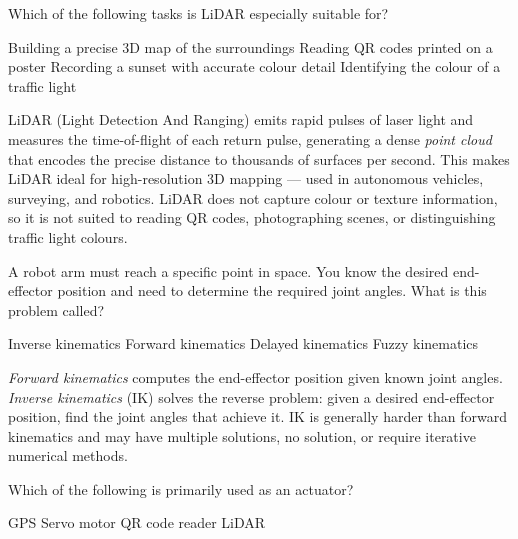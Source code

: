 \documentclass[answers]{exam}
\begin{document}
\begin{questions}
\question Which of the following tasks is LiDAR especially suitable for?

\begin{choices}
    \correctchoice Building a precise 3D map of the surroundings
    \choice Reading QR codes printed on a poster
    \choice Recording a sunset with accurate colour detail
    \choice Identifying the colour of a traffic light
\end{choices}

\begin{solution}
    LiDAR (Light Detection And Ranging) emits rapid pulses of laser light and measures the time-of-flight of each return pulse, generating a dense \textit{point cloud} that encodes the precise distance to thousands of surfaces per second.
    This makes LiDAR ideal for high-resolution 3D mapping --- used in autonomous vehicles, surveying, and robotics.
    LiDAR does not capture colour or texture information, so it is not suited to reading QR codes, photographing scenes, or distinguishing traffic light colours.
\end{solution}

\question A robot arm must reach a specific point in space. You know the desired end-effector position and need to determine the required joint angles. What is this problem called?

\begin{oneparchoices}
    \correctchoice Inverse kinematics
    \choice Forward kinematics
    \choice Delayed kinematics
    \choice Fuzzy kinematics
\end{oneparchoices}

\begin{solution}
    \textit{Forward kinematics} computes the end-effector position given known joint angles.
    \textit{Inverse kinematics} (IK) solves the reverse problem: given a desired end-effector position, find the joint angles that achieve it.
    IK is generally harder than forward kinematics and may have multiple solutions, no solution, or require iterative numerical methods.
\end{solution}

\question Which of the following is primarily used as an actuator?

\begin{oneparchoices}
    \choice GPS
    \correctchoice Servo motor
    \choice QR code reader
    \choice LiDAR
\end{oneparchoices}


\end{questions}
\end{document}
